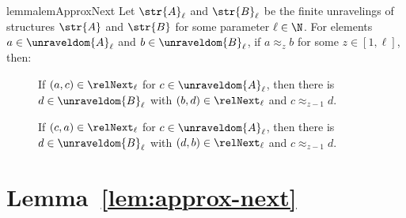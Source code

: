 \ifmainpart
\begin{restatable}{lemma}{lemApproxNext}\label{lem:approx-next}
  Let $\str{A}_{\ell}$ and $\str{B}_{\ell}$ be the finite unravelings of structures $\str{A}$ and $\str{B}$ for some parameter $\ell \in \N$.
  For elements $a \in \unraveldom{A}_{\ell}$ and $b \in \unraveldom{B}_{\ell}$, if $a \approx_{z} b$ for some $z \in [1,\ell]$, then:
  \begin{description}
    \item[] If $(a, c) \in \relNext_{\ell}$ for $c \in \unraveldom{A}_{\ell}$, then there is $d \in \unraveldom{B}_{\ell}$ with $(b, d) \in \relNext_{\ell}$ and $c \approx_{z-1} d$.
    \item[] If $(c, a) \in \relNext_{\ell}$ for $c \in \unraveldom{A}_{\ell}$, then there is $d \in \unraveldom{B}_{\ell}$ with $(d, b) \in \relNext_{\ell}$ and $c \approx_{z-1} d$.
  \end{description}
\end{restatable}
\else
  \section{Lemma~\ref{lem:approx-next}}
  \lemApproxNext*
\fi

